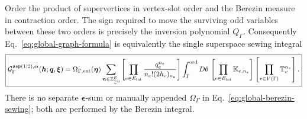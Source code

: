 \documentclass[11pt]{article}
\newcommand{\osp}{\mathfrak{osp}(1|2)}
\newcommand{\G}{\mathcal G}
\begin{document}
Order the product of supervertices in vertex-slot order and the Berezin
measure in contraction order.  The sign required to move the surviving odd
variables between these two orders is precisely the inversion polynomial
\(Q_\Gamma\).  Consequently Eq.~\eqref{eq:global-graph-formula} is
equivalently the single superspace sewing integral
\begin{equation}
\boxed{
 \G_\Gamma^{\osp,\bm\alpha}(\bm h;\bm q,\bm\xi)
 =\Omega_{\Gamma,{\rm ext}}(\bm\eta)
 \sum_{\bm n\in\mathbb Z_{\ge0}^{E}}
 \left[\prod_{e\in E_{\rm int}}
  \frac{q_e^{n_e}}{n_e!(2h_e)_{n_e}}\right]
 \int_\Gamma^{\rm ord}D\theta\,
 \left[\prod_{e\in E_{\rm int}}\mathbb K_{e,n_e}\right]
 \left[\prod_{v\in V(\Gamma)}\mathbb T_v^{\alpha_v}\right].}
 \label{eq:global-berezin-sewing}
\end{equation}
There is no separate \(\bm\epsilon\)-sum or manually appended
\(\Omega_\Gamma\) in Eq.~\eqref{eq:global-berezin-sewing}; both are performed
by the Berezin integral.
\end{document}
